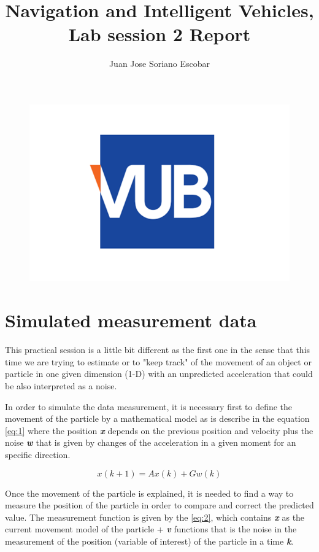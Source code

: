 \documentclass{article}
\begin{document}
        \begin{figure}
            \centering
            \includegraphics[width=0.5\linewidth]{../Session 1/img/vub.png}
        \end{figure}
        \title{Navigation and Intelligent Vehicles, Lab session 2 Report}
        \author{Juan Jose Soriano Escobar }
        \maketitle
        \newpage

        \section{Simulated measurement data}
        
        This practical session is a little bit different as the first one in the sense that
        this time we are trying to estimate or to "keep track" of the movement of  an object
        or particle in one given dimension (1-D) with an unpredicted acceleration that could be
        also interpreted as a noise.
        
        In order to simulate the data measurement, it is necessary first to define the movement of
        the particle by a mathematical model as is describe in the equation \ref{eq:1} where the position
        \textbf{\textit{x}} depends on the previous position and velocity plus the noise \textbf{\textit{w}}
        that is given by changes of the acceleration in a given moment for an specific direction.

        \begin{equation}\label{eq:1}
            x(k + 1) = Ax(k) + Gw(k) 
        \end{equation}

        Once the movement of the particle is explained, it is needed to find a way to measure the position of 
        the particle in order to compare and correct the predicted value. The measurement function is given by
        the \ref{eq:2}, which contains \textbf{\textit{x}} as the current movement model of the particle + \textbf{\textit{v}}
        functions that is the noise in the measurement of the position (variable of interest) of the particle in a time 
        \textbf{\textit{k}}.
\end{document}

